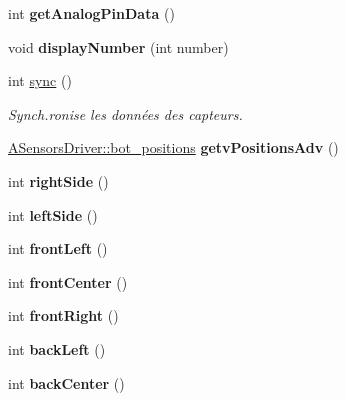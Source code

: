 \begin{DoxyCompactItemize}
int {\bfseries get\+Analog\+Pin\+Data} ()
\item 
\mbox{\label{classSensorsDriver_a0af2bde4cdb1f11d3a06f18a173b11bf}} 
void {\bfseries display\+Number} (int number)
\item 
int \hyperlink{classSensorsDriver_a1bfbcc82461257094ed185fa2017afad}{sync} ()
\begin{DoxyCompactList}\small\item\em Synch.\+ronise les données des capteurs. \end{DoxyCompactList}\item 
\mbox{\label{classSensorsDriver_ac2b9d1fbaae6cbf09547f2a2d2e41af9}} 
\hyperlink{classASensorsDriver_a9743a29ef7d4faebd915f096f07bf729}{A\+Sensors\+Driver\+::bot\+\_\+positions} {\bfseries getv\+Positions\+Adv} ()
\item 
\mbox{\label{classSensorsDriver_ac1c1e82e2e28051147677faf1b002d0a}} 
int {\bfseries right\+Side} ()
\item 
\mbox{\label{classSensorsDriver_af30421d64581a0094f2762cf506032d9}} 
int {\bfseries left\+Side} ()
\item 
\mbox{\label{classSensorsDriver_ad9f2ff84de03a165c10848f8d9f21930}} 
int {\bfseries front\+Left} ()
\item 
\mbox{\label{classSensorsDriver_a3378e277cfb43319eb7b59b9b3fe3d12}} 
int {\bfseries front\+Center} ()
\item 
\mbox{\label{classSensorsDriver_a42e9d37f155cadf71e325bed5f46741e}} 
int {\bfseries front\+Right} ()
\item 
\mbox{\label{classSensorsDriver_ae0b9ea28342e6b59bbb2f9bfe187e839}} 
int {\bfseries back\+Left} ()
\item 
\mbox{\label{classSensorsDriver_ab2f96ed01fb916197ffb8906a6796c97}} 
int {\bfseries back\+Center} ()
\item 
\mbox{\label{classSensorsDriver_a4469035aacbc45c754dd3ae5e23275b3}} 

\end{DoxyCompactItemize}
